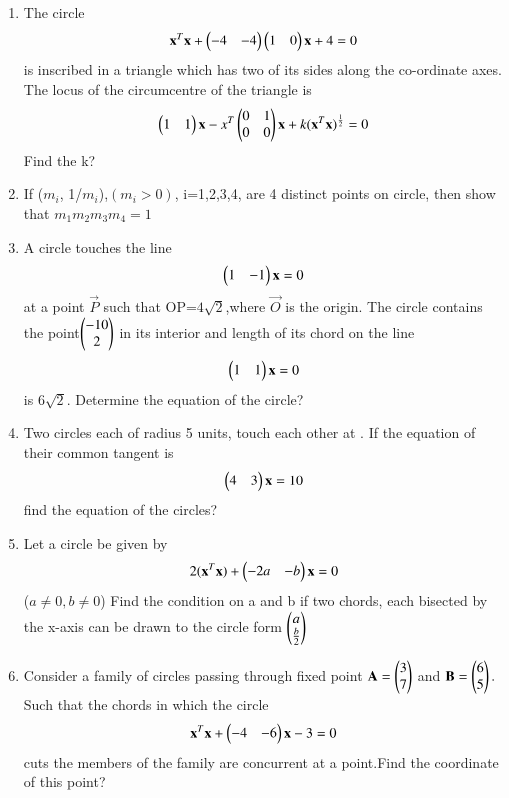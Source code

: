 \begin{enumerate}[label=\arabic*.,ref=\thesubsection.\theenumi]
\item The circle 
\begin{align}
\mathbf{x}^T\mathbf{x}+\begin{pmatrix}-4&-4\end{pmatrix} \begin{pmatrix}1&0\end{pmatrix}\mathbf{x}+4=0
\end{align} 
is inscribed in a triangle which has two of its sides along the co-ordinate axes. The locus of the circumcentre of the triangle is 
\begin{align}
\begin{pmatrix}1&1\end{pmatrix}\mathbf{x}-x^T\begin{pmatrix} 0 & 1 \\ 0 & 0 \end{pmatrix} \mathbf{x}+k(\mathbf{x}^T \mathbf{x})^{\frac{1}{2}}=0
\end{align} 
Find the k?
   
\item If ($m_i$, 1/$m_i$),$(m_i > 0)$, i=1,2,3,4, are 4 distinct points on circle, then show that $m_1 m_2m_3m_4=1$
 
\item A circle touches the line 
\begin{align}
\begin{pmatrix}1&-1\end{pmatrix}\mathbf{x}=0
\end{align} 
at a point $\vec{P}$ such that OP=$4\sqrt{2}$,where $\vec{O}$ is the origin. The circle contains the point$\begin{pmatrix}-10 \\ 2\end{pmatrix}$ in its interior and length of its chord on the line
\begin{align}
\begin{pmatrix}1&1\end{pmatrix}\mathbf{x}=0
\end{align}
 is $6\sqrt{2}$. Determine the equation of the circle?

\item Two circles each of radius 5 units, touch each other at . If the equation of their common tangent is 
\begin{align}
\begin{pmatrix}4&3\end{pmatrix}\mathbf{x}=10
\end{align}
find the equation of the circles?
 
\item Let a circle be given by 
\begin{align}
2(\mathbf{x}^T\mathbf{x})+\begin{pmatrix}-2a&-b\end{pmatrix}\mathbf{x}=0
\end{align}
($a\neq0,b\neq0$) Find the condition on a and b if two chords, each bisected by the x-axis can be drawn to the circle form $\begin{pmatrix}a \\ \frac{b}{2}\end{pmatrix}$
    
\item Consider a family of circles passing through fixed point $\mathbf{A}=\begin{pmatrix}3 \\ 7\end{pmatrix}$ and $\mathbf{B}=\begin{pmatrix}6 \\ 5\end{pmatrix}.$ Such that the chords in which the circle 
\begin{align}
\mathbf{x}^T\mathbf{x}+\begin{pmatrix}-4&-6\end{pmatrix}\mathbf{x}-3=0
\end{align}
cuts the members of the family are concurrent at a point.Find the coordinate of this point?
 

\end{enumerate}
